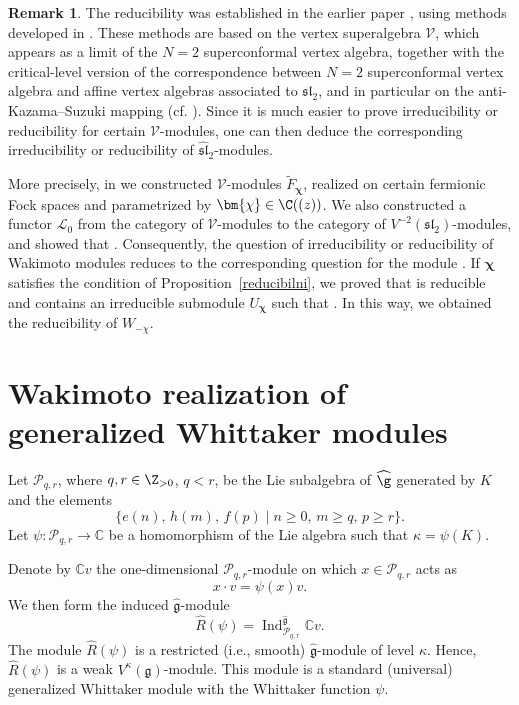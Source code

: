 \documentclass[10pt,a4paper]{amsart}
\numberwithin{equation}{section}
\theoremstyle{definition}
\newtheorem{Remark}[Theorem]{Remark}
\newcommand{\1}{\textbf{1}}
\begin{document}
\begin{Remark}
The reducibility was established in the earlier paper \cite{A-14}, using methods developed in \cite{A-07}. These methods are based on the vertex superalgebra $\mathcal V$, which appears as a limit of the $N=2$ superconformal vertex algebra, together with the critical-level version of the correspondence between $N=2$ superconformal vertex algebra and affine vertex algebras associated to $\mathfrak{sl}_2$, and in particular on the anti-Kazama--Suzuki mapping (cf. \cite{A-1999, FST}). Since it is much easier to prove irreducibility or reducibility for certain $\mathcal V$-modules, one can then deduce the corresponding irreducibility or reducibility of $\widehat{\mathfrak{sl}}_2$-modules.

More precisely, in \cite{A-07} we constructed $\mathcal V$-modules $\widetilde F_{\bm{\chi}}$, realized on certain fermionic Fock spaces and parametrized by $\bm{\chi} \in \C((z))$. We also constructed a functor $\mathcal L_0$ from the category of $\mathcal V$\nobreakdash-mod\-ules to the category of $V^{-2}(\mathfrak{sl}_2)$-modules, and showed that
.
Consequently, the question of irreducibility or reducibility of Wakimoto modules reduces to the corresponding question for the module . If $\bm{\chi}$ satisfies the condition of Proposition~\ref{reducibilni}, we proved that  is reducible and contains an irreducible submodule $U_{\bm{\chi}}$ such that
.
In this way, we obtained the reducibility of $W_{-\chi}$.
\end{Remark}

\section{Wakimoto realization of generalized Whittaker modules}
 \label{gen-whitt-sect}

Let $\mathcal P_{q, r}$, where $q, r \in {\Z}_{>0}$, $q < r$, be the Lie subalgebra of $\widehat{\g}$ generated by $K$ and the elements
\[
 \{ e(n),\, h(m),\, f(p) \mid n \ge 0 ,\, m \ge q, \, p \ge r \}.
\]
Let $\psi \colon \mathcal{P}_{q, r} \to \mathbb{C}$ be a homomorphism of the Lie algebra such that $\kappa = \psi(K)$.

Denote by $\mathbb{C}v$ the one-dimensional $\mathcal{P}_{q,r }$-module on which $x \in \mathcal{P}_{q, r}$ acts as
\begin{equation}\label{whit-gen}
x\cdot v=\psi(x) v.
\end{equation}
We then form the induced $\widehat{\mathfrak{g}}$-module
\[
 \widehat{R}(\psi) = \operatorname{Ind}_{\mathcal{P}_{q, r}}^{\widehat{\mathfrak{g}}} \mathbb{C}v.
\]
The module $\widehat{R}(\psi)$ is a restricted (i.e., smooth) $\widehat{\mathfrak{g}}$-module of level $\kappa$.
Hence, $\widehat{R}(\psi)$ is a weak $V^{\kappa}(\mathfrak{g})$-module. This module is a standard (universal) generalized Whittaker module with the Whittaker function $\psi$.
\end{document}
